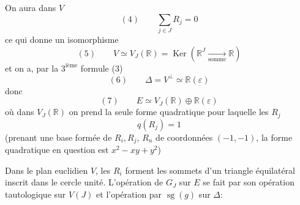 On aura dans $V$
\[
(4)\qquad\sum_{j\in J}R_j=0
\]
ce qui donne un isomorphisme
\[
(5)\qquad V\simeq V_J(\mathbb R)=\operatorname{Ker}(\mathbb R^J\xrightarrow[\text{somme}]{}\mathbb R)
\]
et on a, par la $3^{\text{ième}}$ formule (3)
\[
(6)\qquad\Delta=V^\perp\simeq\mathbb R(\varepsilon)
\]
donc
\[
(7)\qquad E\simeq V_J(\mathbb R)\oplus\mathbb R(\varepsilon)
\]
où dans $V_J(\mathbb R)$ on prend la seule forme quadratique  pour laquelle les $R_j$   
\[
q(R_j)=1
\]
(prenant une base formée de $R_i,R_j$, $R_n$ de coordonnées $(-1,-1)$, la forme quadratique en question est $x^2-xy+y^2$)

Dans le plan euclidien $V$, les $R_i$  forment les sommets d'un triangle équilatéral inscrit dans le cercle unité. L'opération de $G_J$ sur $E$ se fait par son opération  tautologique sur $V(J)$ et l'opération par $\operatorname{sg}(g)$ sur $\Delta$:
